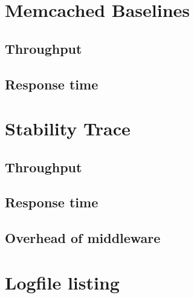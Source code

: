 \documentclass[11pt]{article}
\begin{document}
\section{Memcached Baselines}\label{sec:baseline}


\subsection{Throughput}\label{sec:baseline:tput}


\subsection{Response time}\label{sec:baseline:rt}


\section{Stability Trace}\label{sec:trace}


\subsection{Throughput}

\subsection{Response time}

\subsection{Overhead of middleware}



\pagebreak

\section*{Logfile listing}
\end{document}
